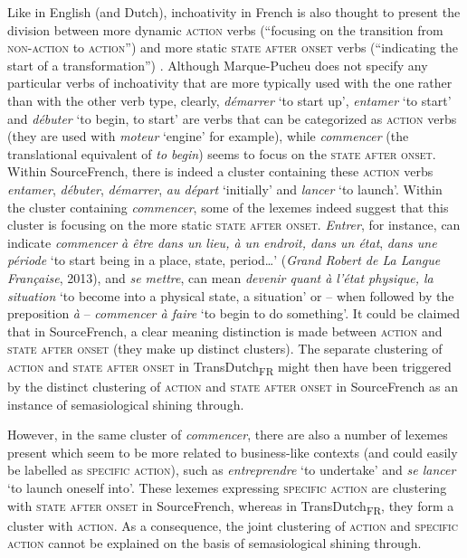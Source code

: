 Like in English (and Dutch), inchoativity in French is also thought to present the division between more dynamic \textsc{action} verbs (“focusing on the transition from \textsc{non-action} to \textsc{action}”) and more static \textsc{state after onset} verbs (“indicating the start of a transformation”) \citep[241]{vogeleer_linchoatif:_1999}. Although Marque-Pucheu does not specify any particular verbs of inchoativity that are more typically used with the one rather than with the other verb type, clearly, \textit{démarrer} `to start up', \textit{entamer} `to start' and \textit{débuter} `to begin, to start' are verbs that can be categorized as \textsc{action} verbs (they are used with \textit{moteur} `engine' for example), while \textit{commencer} (the translational equivalent of \textit{to begin}) seems to focus on the \textsc{state after onset}. Within SourceFrench, there is indeed a cluster containing these \textsc{action} verbs \textit{entamer}, \textit{débuter}, \textit{démarrer}, \textit{au départ} `initially' and \textit{lancer} `to launch'. Within the cluster containing \textit{commencer}, some of the lexemes indeed suggest that this cluster is focusing on the more static \textsc{state after onset}. \textit{Entrer}, for instance, can indicate \textit{commencer à être dans un lieu, à un endroit, dans un état}, \textit{dans une période} `to start being in a place, state, period…' (\textit{Grand Robert de La Langue Française}, 2013), and \textit{se mettre}, can mean \textit{devenir quant à l'état physique, la situation} `to become into a physical state, a situation' or -- when followed by the preposition \textit{à} – \textit{commencer à faire} `to begin to do something'. It could be claimed that in SourceFrench, a clear meaning distinction is made between \textsc{action} and \textsc{state after onset} (they make up distinct clusters). The separate clustering of \textsc{action} and \textsc{state after onset} in TransDutch\textsubscript{FR} might then have been triggered by the distinct clustering of \textsc{action} and \textsc{state after onset} in SourceFrench as an instance of semasiological shining through.

However, in the same cluster of \textit{commencer}, there are also a number of lexemes present which seem to be more related to business-like contexts (and could easily be labelled as {\textsc{specific}} \textsc{action}), such as \textit{entreprendre} `to undertake' and \textit{se lancer} `to launch oneself into'. These lexemes expressing {\textsc{specific}} \textsc{action} are clustering with \textsc{state after onset} in SourceFrench, whereas in TransDutch\textsubscript{FR}, they form a cluster with \textsc{action}. As a consequence, the joint clustering of \textsc{action} and {\textsc{specific}} \textsc{action} cannot be explained on the basis of semasiological shining through.

